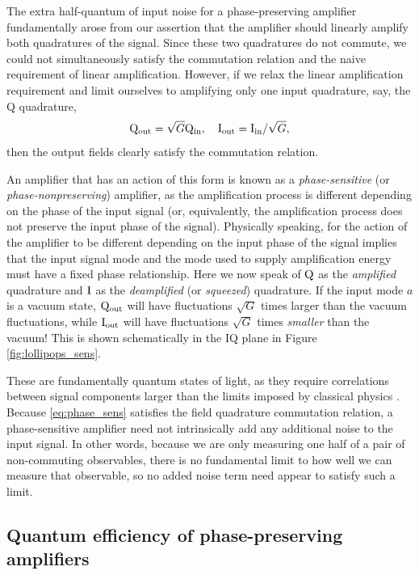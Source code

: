 The extra half-quantum of input noise for a phase-preserving amplifier fundamentally arose from our assertion that the amplifier should linearly amplify both quadratures of the signal.  Since these two quadratures do not commute, we could not simultaneously satisfy the commutation relation and the naive requirement of linear amplification.  However, if we relax the linear amplification requirement and limit ourselves to amplifying only one input quadrature, say, the Q quadrature,
\begin{equation}
\mathrm{Q}_{\rm out} = \sqrt{G} \mathrm{Q}_{\rm in}, \quad \mathrm{I}_{\rm out} = \mathrm{I}_{\rm in} / \sqrt{G},
\label{eq:phase_sens}
\end{equation}
then the output fields clearly satisfy the commutation relation.

An amplifier that has an action of this form is known as a \textit{phase-sensitive} (or \textit{phase-nonpreserving}) amplifier, as the amplification process is different depending on the phase of the input signal (or, equivalently, the amplification process does not preserve the input phase of the signal).  Physically speaking, for the action of the amplifier to be different depending on the input phase of the signal implies that the input signal mode and the mode used to supply amplification energy must have a fixed phase relationship.  Here we now speak of $\rm Q$ as the \textit{amplified} quadrature and $\rm I$ as the \textit{deamplified} (or \textit{squeezed}) quadrature.  If the input mode $a$ is a vacuum state, $\rm Q_{out}$ will have fluctuations $\sqrt{G}$ times larger than the vacuum fluctuations, while $\rm I_{out}$ will have fluctuations $\sqrt{G}$ times \textit{smaller} than the vacuum!  This is shown schematically in the IQ plane in Figure \ref{fig:lollipops_sens}.

These are fundamentally quantum states of light, as they require correlations between signal components larger than the limits imposed by classical physics \cite{Loudon1987}.  Because \eqref{eq:phase_sens} satisfies the field quadrature commutation relation, a phase-sensitive amplifier need not intrinsically add any additional noise to the input signal.  In other words, because we are only measuring one half of a pair of non-commuting observables, there is no fundamental limit to how well we can measure that observable, so no added noise term need appear to satisfy such a limit.

\subsection{Quantum efficiency of phase-preserving amplifiers}

